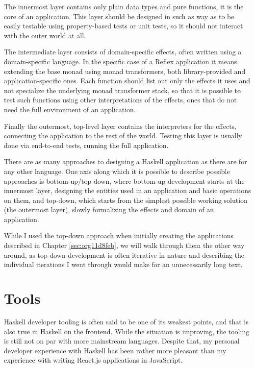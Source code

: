 \documentclass[english,zadani,odsaz]{fitthesis}
\begin{document}
The innermost layer contains only plain data types and pure functions, it is the
core of an application. This layer should be designed in such as way as to be
easily testable using property-based tests or unit tests, so it should not
interact with the outer world at all.

The intermediate layer consists of domain-specific effects, often written using
a domain-specific language. In the specific case of a Reflex application it
means extending the base monad using monad transformers, both library-provided
and application-specific ones. Each function should list out only the effects it
uses and not specialize the underlying monad transformer stack, so that it is
possible to test such functions using other interpretations of the effects, ones
that do not need the full environment of an application.

Finally the outermost, top-level layer contains the interpreters for the
effects, connecting the application to the rest of the world. Testing this layer
is usually done via end-to-end tests, running the full application.

There are as many approaches to designing a Haskell application as there are for
any other language. One axis along which it is possible to describe possible
approaches is bottom-up/top-down, where bottom-up development starts at the
innermost layer, designing the entities used in an application and basic
operations on them, and top-down, which starts from the simplest possible
working solution (the outermost layer), slowly formalizing the effects and
domain of an application.

While I used the top-down approach when initially creating the applications
described in Chapter \ref{sec:org11d8feb}, we will walk through them the other way
around, as top-down development is often iterative in nature and describing the
individual iterations I went through would make for an unnecessarily long text.

\section{Tools}
\label{sec:orgdc8c02a}
Haskell developer tooling is often said to be one of its weakest points, and
that is also true in Haskell on the frontend. While the situation is improving,
the tooling is still not on par with more mainstream languages. Despite that, my
personal developer experience with Haskell has been rather more pleasant than my
experience with writing React.js applications in JavaScript.
\end{document}
